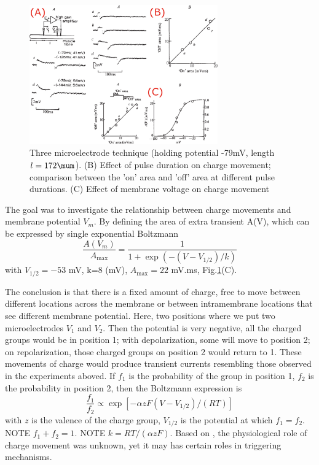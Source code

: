 \begin{figure}[hbt]
  \centerline{\includegraphics[height=6cm,
    angle=0]{./images/Vstim_Charge_movement_Schneider1973.eps}}
  \caption{Three microelectrode technique (holding potential -79mV, length
  $l=172\mum$). (B) Effect of pulse duration on charge movement; comparison
  between the 'on' area and 'off' area at different pulse durations. (C)
  Effect of membrane voltage on charge movement \citep{Schneider1973}}
\label{fig:Vstim_Charge_movement_Schneider1973}
\end{figure}

The goal was to investigate the relationship between charge movements and
membrane potential $V_m$. By defining the area of extra transient A(V), which
can be expressed by single exponential Boltzmann
\begin{equation}
\frac{A(V_m)}{A_\max} = \frac{1}{1+\exp(-(V-V_{1/2})/k)}
\end{equation}
with $V_{1/2}=-53$ mV, k=8 (mV), $A_\max = 22$ mV.ms,
Fig.\ref{fig:Vstim_Charge_movement_Schneider1973}(C).

The conclusion is that there is a fixed amount of charge, free to move between
different locations across the membrane or between intramembrane locations that
see different membrane potential. Here, two positions where we put two
microelectrodes $V_1$ and $V_2$. Then the potential is very negative, all the
charged groups would be in position 1; with depolarization, some will move to
position 2; on repolarization, those charged groups on position 2 would return
to 1. These movements of charge would produce transient currents resembling
those observed in the experiments aboved. If $f_1$ is the probability of the
group in position 1, $f_2$ is the probability in position 2, then the Boltzmann
expression is
\begin{equation}
\frac{f_1}{f_2} \propto \exp \left[ -\alpha z F (V-V_{1/2})/(RT) \right]
\end{equation}
with $z$ is the valence of the charge group, $V_{1/2}$ is the potential at which
$f_1=f_2$. NOTE $f_1+f_2 = 1$. NOTE $k = RT/(\alpha z F)$. Based on
\citep{Schneider1973}, the physiological role of charge movement was unknown,
yet it may has certain roles in triggering mechanisms.

